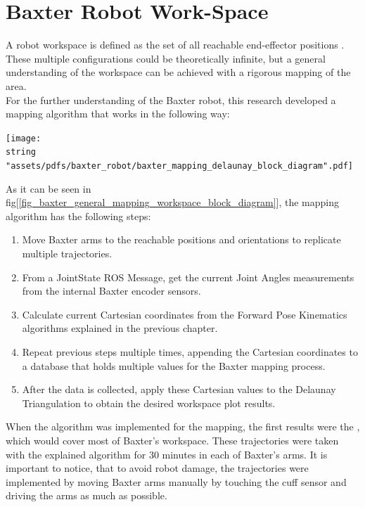 \documentclass[11pt]{report} %
\begin{document}
\section{Baxter Robot Work-Space}

A robot workspace is defined as the set of all reachable end-effector positions \citep{cite_robot_academy}. These multiple configurations could be theoretically infinite, but a general understanding of the workspace can be achieved with a rigorous mapping of the area.\\

For the further understanding of the Baxter robot, this research developed a mapping algorithm that works in the following way:

\begin{center}
\texttt{[image: \\string "assets/pdfs/baxter\_robot/baxter\_mapping\_delaunay\_block\_diagram".pdf]}
\bigbreak
\begin{minipage}{\linewidth} %
\label{fig_baxter_general_mapping_workspace_block_diagram}
\end{minipage} \end{center}

As it can be seen in fig[\ref{fig_baxter_general_mapping_workspace_block_diagram}], the mapping algorithm has the following steps:

\begin{enumerate}
    \item Move Baxter arms to the reachable positions and orientations to replicate multiple trajectories.
    \item From a JointState ROS Message, get the current Joint Angles measurements from the internal Baxter encoder sensors.
    \item Calculate current Cartesian coordinates from the Forward Pose Kinematics algorithms explained in the previous chapter.
    \item Repeat previous steps multiple times, appending the Cartesian coordinates to a database that holds multiple values for the Baxter mapping process.
    \item After the data is collected, apply these Cartesian values to the Delaunay Triangulation to obtain the desired workspace plot results.
\end{enumerate}

When the algorithm was implemented for the mapping, the first results were the , which would cover most of Baxter's workspace. These trajectories were taken with the explained algorithm for 30 minutes in each of Baxter's arms. It is important to notice, that to avoid robot damage, the trajectories were implemented by moving Baxter arms manually by touching the cuff sensor and driving the arms as much as possible.\\
\end{document}
